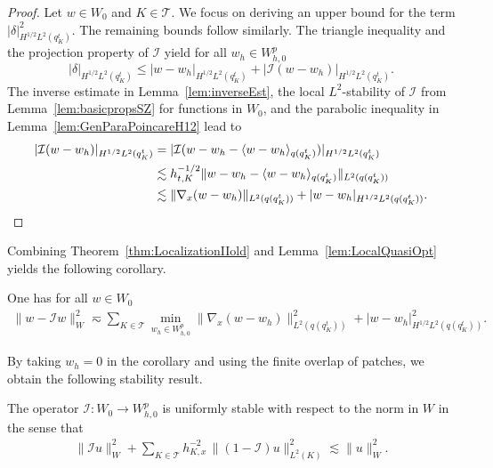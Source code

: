 \documentclass{amsart}
\providecommand{\tria}{\mathcal{T}}
\begin{document}
\begin{proof}
Let $w \in W_0$ and $K\in \tria$. We focus on deriving an upper bound for the term $\lvert  \delta \rvert_{H^{1/2}L^2(q^t_K)}^2$. The remaining bounds follow similarly. The triangle inequality and the projection property of $\mathcal{I}$ yield for all $w_h \in W_{h,0}^p$
\begin{equation*}
\lvert \delta \rvert_{H^{1/2}L^2(q^t_K)} \leq  \lvert w- w_h \rvert_{H^{1/2}L^2(q^t_K)} + \lvert \mathcal{I}(w-w_h) \rvert_{H^{1/2}L^2(q^t_K)}.
\end{equation*}
The inverse estimate in Lemma~\ref{lem:inverseEst}, the local $L^2$-stability of $\mathcal{I}$ from Lemma~\ref{lem:basicpropsSZ} for functions in $W_0$, and the parabolic \Poincare{} inequality in Lemma~\ref{lem:GenParaPoincareH12} lead to
\begin{align*}
\lvert \mathcal{I}(w-w_h) \rvert_{H^{1/2}L^2(q^t_K)} & = \lvert \mathcal{I}(w-w_h - \langle w - w_h\rangle_{q(q_K^t)}) \rvert_{H^{1/2}L^2(q^t_K)}\\
& \lesssim h_{t,K}^{-1/2}\lVert  w - w_h - \langle w - w_h\rangle_{q(q_K^t)} \rVert_{L^2(q(q_K^t))} \\
& \lesssim \lVert \nabla_x (w-w_h) \rVert_{L^2(q(q_K^t))} + \lvert w - w_h \rvert_{H^{1/2}L^2(q(q_K^t))}.\qedhere
\end{align*}
\end{proof}
%
Combining Theorem~\ref{thm:LocalizationIIold} and Lemma~\ref{lem:LocalQuasiOpt} yields the following corollary.
\begin{corollary}\label{cor:QuasBest}
One has for all $w\in W_0$
\begin{align*}
\lVert w-\mathcal{I} w \rVert_W^2
 \eqsim \sum_{K\in \tria} \min_{w_h\in W^p_{h,0}} \lVert  \nabla_x (w-w_h) \rVert_{L^2(q(q^t_K))}^2 + \lvert w-w_h \rvert_{H^{1/2}L^2(q(q^t_K))}^2.
\end{align*} 
\end{corollary}
%
By taking $w_h=0$ in the corollary and using the finite overlap of patches, we obtain the following stability result.
\begin{corollary}[Stability]\label{cor:Stability}
The operator $\mathcal{I}\colon W_0 \to W_{h,0}^p$ is uniformly stable with respect to the norm in $W$ in the sense that 
\begin{align*}
\|\mathcal{I} u\|_W^2+ \sum_{K \in \tria} h_{K,x}^{-2} \, \|(1-\mathcal{I})u\|^2_{L^2(K)} \lesssim \|u\|_W^2.
\end{align*}
\end{corollary}
\end{document}
